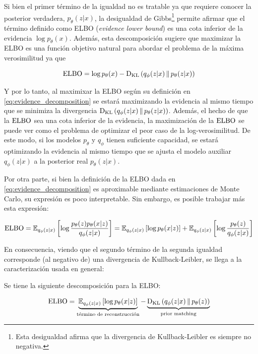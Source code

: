 Si bien el primer término de la igualdad no es tratable ya que requiere conocer la posterior verdadera, $p_\theta(z|x)$, la desigualdad de Gibbs\footnote{Esta desigualdad afirma que la divergencia de Kullback-Leibler es siempre no negativa.} permite afirmar que el término definido como ELBO (\textit{evidence lower bound}) es una cota inferior de la evidencia $\log p_\theta(x)$. Además, esta descomposición sugiere que maximizar la ELBO es una función objetivo natural para abordar el problema de la máxima verosimilitud ya que

\begin{equation*}
    \operatorname{ELBO} = \log p_\theta(x) - \operatorname{D_{KL}}\left(q_\phi(z|x)\,\|\,p_\theta(z|x)\right)
\end{equation*}

Y por lo tanto, al maximixar la ELBO según su definición en \eqref{eq:evidence_decomposition} se estará maximizando la evidencia al mismo tiempo que se minimiza la divergencia $\operatorname{D_{KL}}\left(q_\phi(z|x)\,\|\,p_\theta(z|x)\right)$. Además, el hecho de que la $\operatorname{ELBO}$ sea una cota inferior de la evidencia, la maximización de la $\operatorname{ELBO}$ se puede ver como el problema de optimizar el peor caso de la log-verosimilitud. De este modo, si los modelos $p_\theta$ y $q_\phi$ tienen suficiente capacidad, se estará optimizando la evidencia al mismo tiempo que se ajusta el modelo auxiliar $q_\phi(z|x)$ a la posterior real $p_\theta(z|x)$.

Por otra parte, si bien la definición de la ELBO dada en \eqref{eq:evidence_decomposition} es aproximable mediante estimaciones de Monte Carlo, su expresión es poco interpretable. Sin embargo, es posible trabajar más esta expresión:

\begin{equation*}
    \operatorname{ELBO}
    = \mathbb{E}_{q_\phi(z|x)}\left[\log\frac{p_\theta(z)p_\theta(x|z)}{q_\phi(z|x)}\right]
    = \mathbb{E}_{q_\phi(z|x)}\left[\log p_\theta(x|z)\right] + \mathbb{E}_{q_\phi(z|x)}\left[\log\frac{p_\theta(z)}{q_\phi(z|x)}\right]
\end{equation*}

En consecuencia, viendo que el segundo término de la segunda igualdad corresponde (al negativo de) una divergencia de Kullback-Leibler, se llega a la caracterización usada en general:

\begin{prop}
    Se tiene la siguiente descomposición para la ELBO:

    \begin{equation}
        \label{eq:elbo_decomposition}
        \operatorname{ELBO}
        = \underbrace{\mathbb{E}_{q_\phi(z|x)}\left[\log p_\theta(x|z)\right]}_{\text{término de reconstrucción}}
        - \underbrace{\operatorname{D_{KL}}\left(q_\phi(z|x)\,\|\,p_\theta(z)\right)}_{\text{prior matching}}
    \end{equation}
\end{prop}

